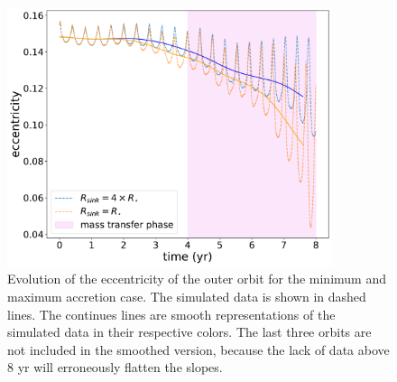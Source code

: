 \begin{figure}[H]
    \centering
    \includegraphics[width=0.85\textwidth]{Thesis/graphs/accretion_case/accretion_outer_ecc.pdf}
    \caption{Evolution of the eccentricity of the outer orbit for the minimum and maximum accretion case. The simulated data is shown in dashed lines. The continues lines are smooth representations of the simulated data in their respective colors. The last three orbits are not included in the smoothed version, because the lack of data above $8$ yr will erroneously flatten the slopes.}
    \label{fig:accretion_outer_ecc}
\end{figure}
